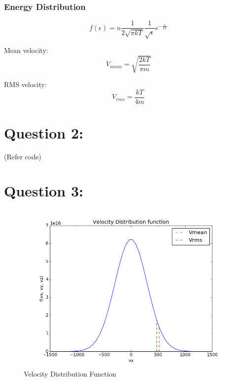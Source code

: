 \documentclass[11pt, a4paper]{article}
\begin{document}
\subsubsection{Energy Distribution}
\begin{equation}
 f(\epsilon) = n\frac{1}{2\sqrt{\pi k T}}\frac{1}{\sqrt{\epsilon}}e^{-\frac{\epsilon}{kT}}
\end{equation}

Mean velocity:
\begin{equation}
 V_{mean} = \sqrt{\frac{2kT}{\pi m}}
\end{equation}

RMS velocity:
\begin{equation}
 V_{rms} = \frac{kT}{4m}
\end{equation}

\section{Question 2:}
(Refer code)
\section{Question 3:}
\begin{figure}[H]
 \centering
 \includegraphics[scale = 0.5]{f_vel.png}
 \caption{Velocity Distribution Function}
 \label{fig:vel_pdf}
\end{figure}
\end{document}
